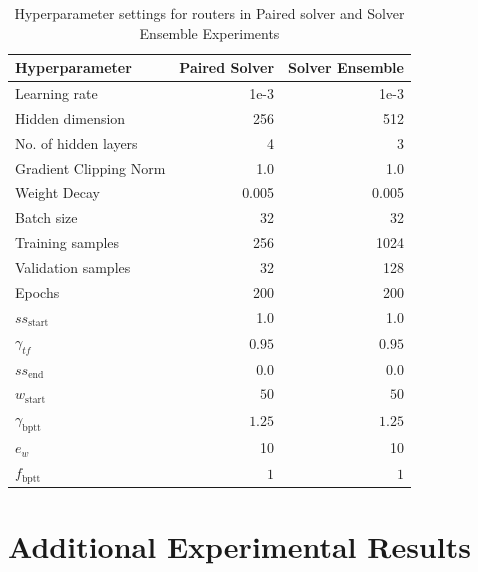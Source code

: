 \documentclass{article}
\begin{document}
\begin{table}[H]
    \centering
    \caption{Hyperparameter settings for routers in Paired solver and Solver Ensemble Experiments}
    \begin{tabular}{lrr}
        \hline
        Hyperparameter & Paired Solver & Solver Ensemble\\
        \hline \hline
        Learning rate & 1e-3 & 1e-3\\
        Hidden dimension & 256 & 512\\
        No. of hidden layers & 4 & 3\\
        Gradient Clipping Norm & 1.0 & 1.0 \\
        Weight Decay & 0.005 & 0.005 \\
        Batch size & 32 & 32 \\
        Training samples & 256 & 1024\\
        Validation samples & 32 & 128 \\
        Epochs & 200 & 200\\
        $ss_{\text{start}}$ & 1.0 & 1.0\\
        $\gamma_{tf}$ & $0.95$ & $0.95$ \\
        $ss_{\text{end}}$ & 0.0 & 0.0 \\
        $w_{\text{start}}$ & $50$ & $50$ \\
        $\gamma_{\text{bptt}}$ & $1.25$ & $1.25$\\
        $e_w$ & 10 & 10\\
        $f_{\text{bptt}}$ & $1$ & $1$\\
        \hline
    \end{tabular}
    \label{tab:routerhpsettings}
\end{table}



\section{Additional Experimental Results} \label{sec:moreexperimentalresults}
\end{document}
